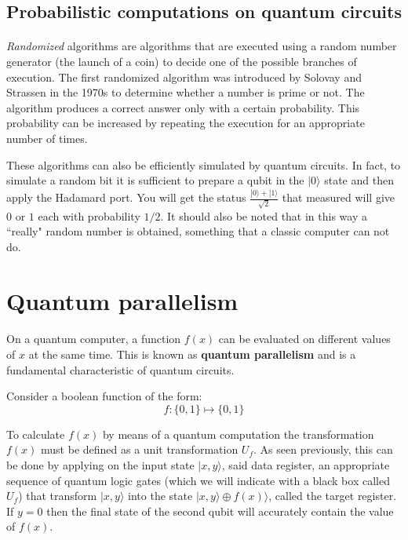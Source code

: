 \documentclass[a4paper,10pt]{article}
\begin{document}
\subsection{Probabilistic computations on quantum circuits}

\paragraph{} \textit{Randomized} algorithms are algorithms that are executed using a random number generator (the launch of a coin) to decide one of the possible branches of execution. The first randomized algorithm was introduced by Solovay and Strassen in the 1970s to determine whether a number is prime or not. The algorithm produces a correct answer only with a certain probability. This probability can be increased by repeating the execution for an appropriate number of times.

These algorithms can also be efficiently simulated by quantum circuits. In fact, to simulate a random bit it is sufficient to prepare a qubit in the $|0\rangle$ state and then apply the Hadamard port. You will get the status $\frac{|0\rangle + |1\rangle}{\sqrt{2}}$ that measured will give $0$ or $1$ each with probability $1/2$. It should also be noted that in this way a ``really" random number is obtained, something that a classic computer can not do.

\section{Quantum parallelism}

\paragraph{} On a quantum computer, a function $f(x)$ can be evaluated on different values of $x$ at the same time. This is known as \textbf{quantum parallelism} and is a fundamental characteristic of quantum circuits.

Consider a boolean function of the form:
$$f : \{0, 1\} \mapsto \{0, 1\}$$

To calculate $f(x)$ by means of a quantum computation the transformation $f(x)$ must be defined as a unit transformation $U_f$. As seen previously, this can be done by applying on the input state $|x,y\rangle$, said data register, an appropriate sequence of quantum logic gates (which we will indicate with a black box called $U_f$) that transform $|x,y\rangle$ into the state $|x,y\rangle \oplus f(x)\rangle$, called the target register. If $y = 0$ then the final state of the second qubit will accurately contain the value of $f(x)$.
\end{document}
